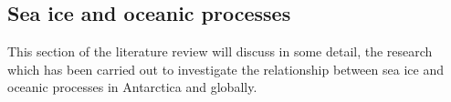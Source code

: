 \subsection{Sea ice and oceanic processes}
This section of the literature review will discuss in some detail, the research which has been carried out to investigate the relationship between sea ice and oceanic processes in Antarctica and globally.